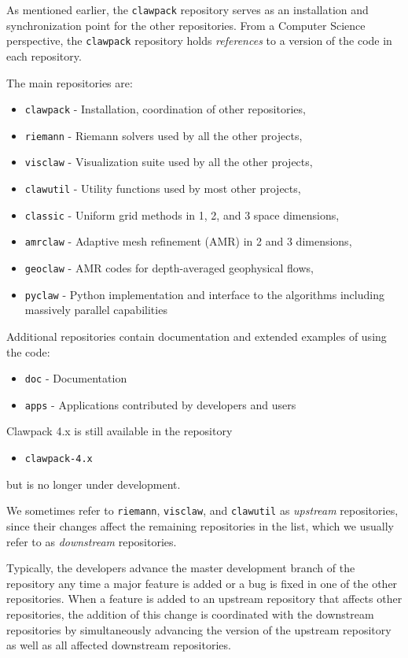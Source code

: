 As mentioned earlier, the \texttt{clawpack} repository serves as an
installation and synchronization point for the other repositories.
From a Computer Science perspective, the \texttt{clawpack} repository
holds \textit{references} to a version of the code in each
repository.  

The main \clawpack repositories are:
\begin{itemize}
    \item \texttt{clawpack} - Installation, coordination of other repositories,
    \item \texttt{riemann} - Riemann solvers used by all the other projects,
    \item \texttt{visclaw} - Visualization suite used by all the other projects,
    \item \texttt{clawutil} - Utility functions used by most other projects,
    \item \texttt{classic} - Uniform grid methods in 1, 2, and 3 space dimensions,
    \item \texttt{amrclaw} - Adaptive mesh refinement (AMR) in 2 and 3 dimensions,
    \item \texttt{geoclaw} - AMR codes for depth-averaged geophysical flows,
    \item \texttt{pyclaw} - Python implementation and interface to the \clawpack algorithms including massively parallel capabilities
\end{itemize}

Additional repositories contain documentation and extended examples of
using the code: 
\begin{itemize}
    \item \texttt{doc} - Documentation
    \item \texttt{apps} - Applications contributed by developers and users
\end{itemize}
Clawpack 4.x is still available in the repository
\begin{itemize}
    \item \texttt{clawpack-4.x}
\end{itemize}
but is no longer under development.

We sometimes refer to \texttt{riemann}, \texttt{visclaw}, and
\texttt{clawutil} as
\textit{upstream} repositories, since their changes affect the
remaining repositories in the list, which we usually refer to as
\textit{downstream} repositories.

Typically, the \clawpack developers advance the master development
branch of the repository any time a major feature is added or a bug is
fixed in one of the other repositories.  When a feature is added to an
upstream repository that affects other repositories, the addition of
this change is coordinated with the downstream repositories by
simultaneously advancing the version of the upstream repository as
well as all affected downstream repositories.  

